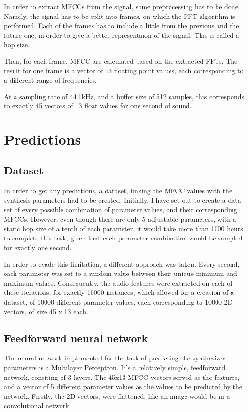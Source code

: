 In order to extract MFCCs from the signal, some preprocessing has to
be done. Namely, the signal has to be split into frames, on which the
FFT algorithm is performed. Each of the frames has to include a little
from the previous and the future one, in order to give a better
representaion of the signal. This is called a hop size.

Then, for each frame, MFCC are calculated based on the extracted
FFTs. The result for one frame is a vector of 13 floating point
values, each corresponding to a different range of frequencies.

At a sampling rate of 44.1kHz, and a buffer size of 512 samples, this
corresponds to exactly 45 vectors of 13 float values for one second of sound.

\section{Predictions}

\subsection{Dataset}

In order to get any predictions, a dataset, linking the MFCC values
with the synthesis parameters had to be created. Initially, I have set
out to create a data set of every possible combination of parameter
values, and their corresponding MFCCs. However, even though there are
only 5 adjustable parameters, with a static hop size of a tenth of
each parameter, it would take more than 1000 hours to complete this
task, given that each parameter combination would be sampled for
exactly one second.

In order to evade this limitation, a different approach was
taken. Every second, each parameter was set to a random value between
their unique minimum and maximum values. Consequently, the audio
features were extracted on each of these iterations, for exactly 10000
instances, which allowed for a creation of a dataset, of 10000
different parameter values, each corresponding to 10000 2D vectors, of
size 45 x 13 each.

\subsection{Feedforward neural network}

The neural network implemented for the task of predicting the
synthesizer parameters is a Multilayer Perceptron. It's a relatively
simple, feedforward network, consiting of 3 layers.  The 45x13 MFCC
vectors served as the features, and a vector of 5 different parameter
values as the values to be predicted by the network. Firstly, the 2D
vectors, were flattened, like an image would be in a convolutional network.

